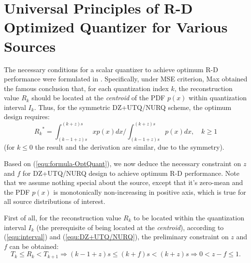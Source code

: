 \documentclass[smallabstract,smallcaptions]{dccpaper}
\begin{document}
\section{Universal Principles of R-D Optimized Quantizer for Various Sources}
\label{sec:principle}

The necessary conditions for a scalar quantizer to achieve optimum R-D performance were formulated in \cite{Farvardin_TIT1984}. Specifically, under MSE criterion, Max \cite{Max_TIT1960} obtained the famous conclusion that, for each quantization index $k$, the reconstruction value $R_k$ should be located at the \emph{centroid} of the PDF $p(x)$ within quantization interval $I_k$. Thus, for the symmetric DZ+UTQ/NURQ scheme, the optimum design requires:
\begin{equation}\label{equ:formula-OptQuant}
	{R_k}^* = \int_{(k-1+z)s}^{(k+z)s} xp(x)dx / \int_{(k-1+z)s}^{(k+z)s} p(x)dx, \quad k \ge 1
\end{equation}
(for $k \le 0$ the result and the derivation are similar, due to the symmetry).

Based on (\ref{equ:formula-OptQuant}), we now deduce the necessary constraint on $z$ and $f$ for DZ+UTQ/NURQ design to achieve optimum R-D performance. Note that we assume nothing special about the source, except that it's zero-mean and the PDF $p(x)$ is monotonically non-increasing in positive axis, which is true for all source distributions of interest.

First of all, for the reconstruction value $R_k$ to be located within the quantization interval $I_k$ (the prerequisite of being located at the \emph{centroid}), according to (\ref{equ:interval}) and (\ref{equ:DZ+UTQ/NURQ}), the preliminary constraint on $z$ and $f$ can be obtained:
\begin{equation}\label{equ:formula-PreConstraint}
	 T_k \le R_k < T_{k+1} \Rightarrow (k-1+z)s \le (k+f)s < (k+z)s \Rightarrow 0 < z - f \le1.
\end{equation}
\end{document}
